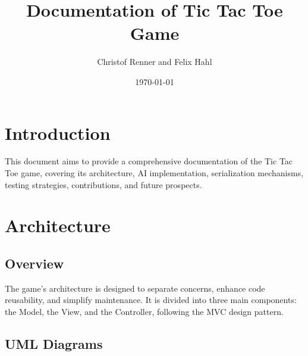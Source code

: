 \documentclass[12pt]{article}
\title{Documentation of Tic Tac Toe Game}
\author{Christof Renner and Felix Hahl}
\date{\today}
\begin{document}
\maketitle

\tableofcontents

\newpage

\section{Introduction}
This document aims to provide a comprehensive documentation of the Tic Tac Toe game, covering its architecture, AI implementation, serialization mechanisms, testing strategies, contributions, and future prospects.

\section{Architecture}
\subsection{Overview}
The game's architecture is designed to separate concerns, enhance code reusability, and simplify maintenance. It is divided into three main components: the Model, the View, and the Controller, following the MVC design pattern.
\subsection{UML Diagrams}

\end{document}
